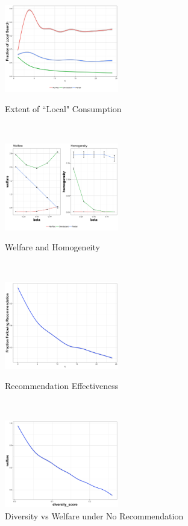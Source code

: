 \documentclass[sigconf]{acmart}
\begin{document}
\begin{figure}[!htbp]
    \centering
    \begin{minipage}[b]{0.5\textwidth}
        \centering
        \includegraphics[width=0.9\linewidth, height=1.5in]{local_moves_25}
        \caption{Extent of ``Local"  Consumption}
        \label{fig:local_consumption}
    \end{minipage}%
    ~ 
    \begin{minipage}[b]{0.5\textwidth}
        \centering
        \includegraphics[width=0.9\linewidth, height=1.5in]{welfare_homo_combo}
        \caption{Welfare and Homogeneity}
        \label{fig:beta_vary}
    \end{minipage}
    ~ \\
     \begin{minipage}{0.48\textwidth}
     \centering
     \includegraphics[width=0.9\linewidth, height=1.5in]{rec_obedience_25}
     \caption{Recommendation Effectiveness}\label{fig:rec_obey}
   \end{minipage}\hfill
   ~
   \begin{minipage}{0.48\textwidth}
     \centering
     \includegraphics[width=0.9\linewidth, height=1.5in]{Diversity_vs_Welfare_No_Recommendation}
     \caption{Diversity vs Welfare under No Recommendation}\label{fig:diversity_welfare_no_rec}
   \end{minipage}
\end{figure}
\end{document}
